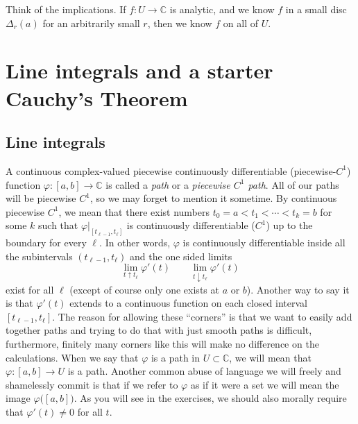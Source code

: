 \documentclass[12pt,openany]{book}
\newcommand{\C}{{\mathbb{C}}}
\newcommand{\myindex}[1]{#1\index{#1}}
\theoremstyle{plain}
\theoremstyle{remark}
\theoremstyle{definition}
\theoremstyle{exercise}
\theoremstyle{example}
\begin{document}
Think of the implications.  If $f \colon U \to \C$ is analytic, and we know
$f$ in a small disc $\Delta_r(a)$ for an arbitrarily small $r$, then
we know $f$ on all of $U$.



\section{Line integrals and a starter Cauchy's Theorem}
\label{sec:cauchysimple}

\subsection{Line integrals}

A continuous complex-valued piecewise continuously
differentiable (piecewise-$C^1$) function $\varphi \colon [a,b] \to \C$ 
is called a \emph{\myindex{path}} or a \emph{\myindex{piecewise $C^1$ path}}.
All of our paths will be piecewise $C^1$, so we may forget to mention it
sometime.
By continuous piecewise $C^1$,
we mean that there exist numbers $t_0 = a < t_1 < \cdots
< t_k = b$ for some $k$ such that $\varphi|_{[t_{\ell-1},t_\ell]}$ is
continuously differentiable ($C^1$) up to
the boundary for every $\ell$.
In other words, $\varphi$ is continuously differentiable inside all the
subintervals $(t_{\ell-1},t_\ell)$ and the one sided limits
\begin{equation*}
\lim_{t \uparrow t_\ell} \varphi'(t) \qquad
\lim_{t \downarrow t_\ell} \varphi'(t)
\end{equation*}
exist for all $\ell$ (except of course only one exists at $a$ or $b$).
Another way to say it is that $\varphi'(t)$ extends to a continuous
function on each closed interval $[t_{\ell-1},t_{\ell}]$.
The reason for allowing these ``corners'' is that we want to easily add
together paths and trying to do that with just smooth paths is difficult,
furthermore, finitely many corners like this will make no difference on the
calculations.
When we say that $\varphi$ is a path in $U \subset \C$, we will mean that
$\varphi \colon [a,b] \to U$ is a path.  Another common abuse of language we
will freely and shamelessly commit is that if we refer to $\varphi$
as if it were a set we will mean the image $\varphi\bigl([a,b]\bigr)$.
As you will see in the exercises,
we should also morally require that $\varphi'(t) \not= 0$ for all $t$.
\end{document}
